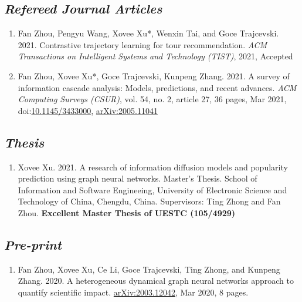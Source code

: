 \subsection*{\textnormal{\textit{Refereed Journal Articles}}}

\begin{enumerate}[resume]
    \item Fan Zhou, Pengyu Wang, Xovee Xu*, Wenxin Tai, and Goce Trajcevski. 2021. Contrastive trajectory learning for tour recommendation. \textit{ACM Transactions on Intelligent Systems and Technology (TIST)}, 2021, Accepted
    \item Fan Zhou, Xovee Xu*, Goce Trajcevski, Kunpeng Zhang. 2021. A survey of information cascade analysis: Models, predictions, and recent advances. \textit{ACM Computing Surveys (CSUR)}, vol. 54, no. 2, article 27, 36 pages, Mar 2021, doi:\href{https://xovee.cn/html/paper-redirects/csur2021.html}{10.1145/3433000}, \href{https://arxiv.org/abs/2005.11041}{arXiv:2005.11041}
\end{enumerate}

\subsection*{\textnormal{\textit{Thesis}}}

\begin{enumerate}[resume]
    \item Xovee Xu. 2021. A research of information diffusion models and popularity prediction using graph neural networks. Master's Thesis. School of Information and Software Engineeing, University of Electronic Science and Technology of China, Chengdu, China. Supervisors: Ting Zhong and Fan Zhou. \newline
    \textbf{\color{red}Excellent Master Thesis of UESTC (105/4929)}
\end{enumerate}

\subsection*{\textnormal{\textit{Pre-print}}}

\begin{enumerate}[resume]
    \item Fan Zhou, Xovee Xu, Ce Li, Goce Trajcevski, Ting Zhong, and Kunpeng Zhang. 2020. A heterogeneous dynamical graph neural networks approach to quantify scientific impact. \href{https://arxiv.org/abs/2003.12042}{arXiv:2003.12042}, Mar 2020, 8 pages. 
\end{enumerate}

